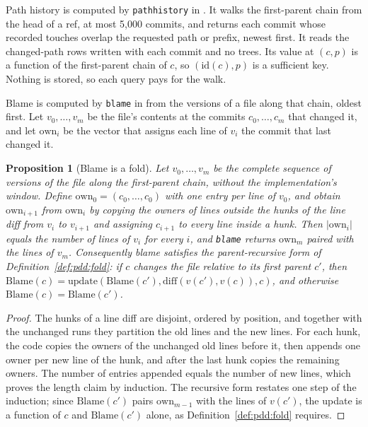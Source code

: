 \documentclass[11pt,letterpaper]{article}
\newtheorem{proposition}[theorem]{Proposition}
\theoremstyle{definition}
\theoremstyle{remark}
\newcommand{\id}{\mathrm{id}}
\DeclareRobustCommand{\code}[1]{{\def\_{\textunderscore\allowbreak}\texttt{#1}}}
\begin{document}
Path history is computed by \code{path\_history} in . It walks the first-parent chain from the head of a ref, at most 5,000 commits, and returns each commit whose recorded touches overlap the requested path or prefix, newest first. It reads the changed-path rows written with each commit and no trees. Its value at $(c,p)$ is a function of the first-parent chain of $c$, so $(\id(c),p)$ is a sufficient key. Nothing is stored, so each query pays for the walk.

Blame is computed by \code{blame} in  from the versions of a file along that chain, oldest first. Let $v_0,\ldots,v_m$ be the file's contents at the commits $c_0,\ldots,c_m$ that changed it, and let $\mathrm{own}_i$ be the vector that assigns each line of $v_i$ the commit that last changed it.

\begin{proposition}[Blame is a fold]
\label{prop:pdd:blame}
Let $v_0,\ldots,v_m$ be the complete sequence of versions of the file along the first-parent chain, without the implementation's window. Define $\mathrm{own}_0=(c_0,\ldots,c_0)$ with one entry per line of $v_0$, and obtain $\mathrm{own}_{i+1}$ from $\mathrm{own}_i$ by copying the owners of lines outside the hunks of the line diff from $v_i$ to $v_{i+1}$ and assigning $c_{i+1}$ to every line inside a hunk. Then $|\mathrm{own}_i|$ equals the number of lines of $v_i$ for every $i$, and \code{blame} returns $\mathrm{own}_m$ paired with the lines of $v_m$. Consequently blame satisfies the parent-recursive form of Definition~\ref{def:pdd:fold}: if $c$ changes the file relative to its first parent $c'$, then $\mathrm{Blame}(c)=\mathrm{update}(\mathrm{Blame}(c'),\mathrm{diff}(v(c'),v(c)),c)$, and otherwise $\mathrm{Blame}(c)=\mathrm{Blame}(c')$.
\end{proposition}

\begin{proof}
The hunks of a line diff are disjoint, ordered by position, and together with the unchanged runs they partition the old lines and the new lines. For each hunk, the code copies the owners of the unchanged old lines before it, then appends one owner per new line of the hunk, and after the last hunk copies the remaining owners. The number of entries appended equals the number of new lines, which proves the length claim by induction. The recursive form restates one step of the induction; since $\mathrm{Blame}(c')$ pairs $\mathrm{own}_{m-1}$ with the lines of $v(c')$, the update is a function of $c$ and $\mathrm{Blame}(c')$ alone, as Definition~\ref{def:pdd:fold} requires.
\end{proof}
\end{document}
